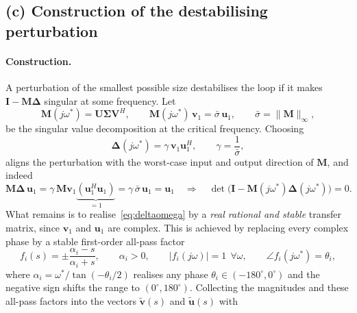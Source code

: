 \subsection{(c) Construction of the destabilising perturbation}

\paragraph{Construction.} A perturbation of the smallest possible size destabilises the loop if
it makes $\mathbf{I}-\mathbf{M}\boldsymbol{\Delta}$ singular at some frequency. Let
\begin{equation}
    \mathbf{M}(j\omega^*) = \mathbf{U}\boldsymbol{\Sigma}\mathbf{V}^H,
    \qquad
    \mathbf{M}(j\omega^*)\,\mathbf{v}_1 = \bar{\sigma}\,\mathbf{u}_1,
    \qquad \bar{\sigma}=\|\mathbf{M}\|_\infty ,
    \label{eq:svd}
\end{equation}
be the singular value decomposition at the critical frequency. Choosing
\begin{equation}
    \boldsymbol{\Delta}(j\omega^*) = \gamma\,\mathbf{v}_1\mathbf{u}_1^H,
    \qquad \gamma = \frac{1}{\bar{\sigma}},
    \label{eq:deltaomega}
\end{equation}
aligns the perturbation with the worst-case input and output direction of $\mathbf{M}$, and
indeed
\begin{equation}
    \mathbf{M}\boldsymbol{\Delta}\,\mathbf{u}_1
    = \gamma\,\mathbf{M}\mathbf{v}_1\underbrace{(\mathbf{u}_1^H\mathbf{u}_1)}_{=1}
    = \gamma\,\bar{\sigma}\,\mathbf{u}_1 = \mathbf{u}_1
    \quad\Longrightarrow\quad
    \det\!\big(\mathbf{I}-\mathbf{M}(j\omega^*)\boldsymbol{\Delta}(j\omega^*)\big)=0 .
    \label{eq:singular}
\end{equation}
What remains is to realise~\eqref{eq:deltaomega} by a \emph{real rational and stable} transfer
matrix, since $\mathbf{v}_1$ and $\mathbf{u}_1$ are complex. This is achieved by replacing every
complex phase by a stable first-order all-pass factor
\begin{equation}
    f_i(s) = \pm\frac{\alpha_i-s}{\alpha_i+s},\qquad \alpha_i>0,
    \qquad |f_i(j\omega)| = 1\ \ \forall\omega,
    \qquad \angle f_i(j\omega^*) = \theta_i ,
    \label{eq:allpass}
\end{equation}
where $\alpha_i=\omega^*/\tan(-\theta_i/2)$ realises any phase $\theta_i\in(-180^\circ,0^\circ)$
and the negative sign shifts the range to $(0^\circ,180^\circ)$. Collecting the magnitudes and
these all-pass factors into the vectors $\tilde{\mathbf{v}}(s)$ and $\tilde{\mathbf{u}}(s)$ with

